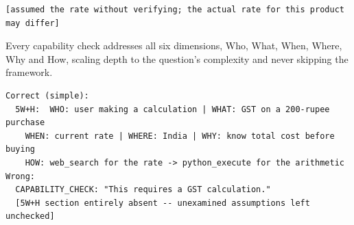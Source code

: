 \begin{description}
\begin{lstlisting}[style=artefact]
  [assumed the rate without verifying; the actual rate for this product may differ]
\end{lstlisting}
  \item[P21 -- 5W+H Questioning.] Every capability check addresses all six dimensions, Who, What, When, Where, Why and How, scaling depth to the question's complexity and never skipping the framework.
\begin{lstlisting}[style=artefact]
Correct (simple):
  5W+H:  WHO: user making a calculation | WHAT: GST on a 200-rupee purchase
    WHEN: current rate | WHERE: India | WHY: know total cost before buying
    HOW: web_search for the rate -> python_execute for the arithmetic
Wrong:
  CAPABILITY_CHECK: "This requires a GST calculation."
  [5W+H section entirely absent -- unexamined assumptions left unchecked]
\end{lstlisting}
\end{description}

